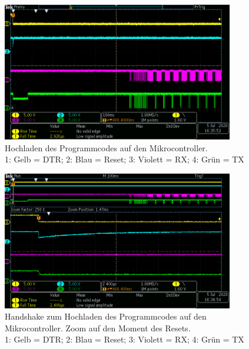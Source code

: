 \begin{figure}[H]
\center
\includegraphics[width = 0.9\textwidth]{graphics/ATMega2560_DTR_RESET_RX_TX_gesamt}
\caption{Hochladen des Programmcodes auf den Mikrocontroller.\\\hspace{\textwidth}1: Gelb = DTR; 2: Blau = Reset; 3: Violett = RX; 4: Grün = TX}
\label{fig:ATMega2560_DTR_RESET_RX_TX_gesamt}
\end{figure}

\begin{figure}[H]
\center
\includegraphics[width =  0.9\textwidth]{graphics/ATMega2560_DTR_RESET_RX_TX_1}
\caption{Handshake zum Hochladen des Programmcodes auf den Mikrocontroller. Zoom auf den Moment des Resets.\\\hspace{\textwidth}1: Gelb = DTR; 2: Blau = Reset; 3: Violett = RX; 4: Grün = TX}
\label{fig:ATMega2560_DTR_RESET_RX_TX_1}
\end{figure}


